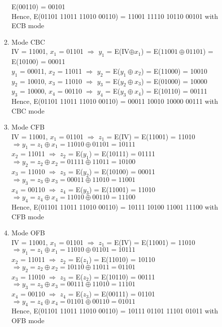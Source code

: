 \documentclass{article}
\begin{document}
\begin{description}[leftmargin=3pt]
\begin{framed}
\begin{description}
\begin{enumerate}
				E(00110) = 00101\\
				Hence, {\color{blue}E(01101 11011 11010 00110) = 11001 11110 10110 00101} with ECB mode
				\item Mode CBC\\
				IV = 11001, $x_1$ = 01101 $\Rightarrow$ $y_1$ = E(IV$\oplus x_1$) = E($11001\oplus01101$) = E(10100) = 00011\\
				$y_1$ = 00011, $x_2$ = 11011 $\Rightarrow$ $y_2$ = E($y_1\oplus x_2$) = E(11000) = 10010\\
				$y_2$ = 10010, $x_3$ = 11010 $\Rightarrow$ $y_3$ = E($y_2\oplus x_3$) = E(01000) = 10000\\
				$y_3$ = 10000, $x_4$ = 00110 $\Rightarrow$ $y_4$ = E($y_3\oplus x_4$) = E(10110) = 00111\\
				Hence, {\color{blue}E(01101 11011 11010 00110) = 00011 10010 10000 00111} with CBC mode
				\item Mode CFB\\
				IV = 11001, $x_1$ = 01101 $\Rightarrow$ $z_1$ = E(IV) = E(11001) = 11010 \\
				$\Rightarrow y_1 = z_1 \oplus x_1 = 11010\oplus 01101 = 10111$\\
				$x_2$ = 11011 $\Rightarrow$ $z_2$ = E($y_1$) = E(10111) = 01111\\
				$\Rightarrow y_2 = z_2 \oplus x_2 = 01111\oplus 11011 = 10100$\\
				$x_3$ = 11010 $\Rightarrow$ $z_3$ = E($y_2$) = E(10100) = 00011\\
				$\Rightarrow y_3 = z_3 \oplus x_3 = 00011\oplus 11010 = 11001$\\
				$x_4$ = 00110 $\Rightarrow$ $z_4$ = E($y_3$) = E(11001) = 11010\\
				$\Rightarrow y_4 = z_4 \oplus x_4 = 11010\oplus 00110 = 11100$\\
				Hence, {\color{blue}E(01101 11011 11010 00110) = 10111 10100 11001 11100} with CFB mode
				\item Mode OFB\\
				IV = 11001, $x_1$ = 01101 $\Rightarrow$ $z_1$ = E(IV) = E(11001) = 11010 \\
				$\Rightarrow y_1 = z_1 \oplus x_1 = 11010\oplus 01101 = 10111$\\
				$x_2$ = 11011 $\Rightarrow$ $z_2$ = E($z_1$) = E(11010) = 10110\\
				$\Rightarrow y_2 = z_2 \oplus x_2 = 10110\oplus 11011 = 01101$\\
				$x_3$ = 11010 $\Rightarrow$ $z_3$ = E($z_2$) = E(10110) = 00111\\
				$\Rightarrow y_3 = z_3 \oplus x_3 = 00111\oplus 11010 = 11101$\\
				$x_4$ = 00110 $\Rightarrow$ $z_4$ = E($z_3$) = E(00111) = 01101\\
				$\Rightarrow y_4 = z_4 \oplus x_4 = 01101\oplus 00110 = 01011$\\
				Hence, {\color{blue}E(01101 11011 11010 00110) = 10111 01101 11101 01011} with OFB mode
			\end{enumerate}
		\end{description}
	\end{framed}
	

\end{description}
\end{document}
